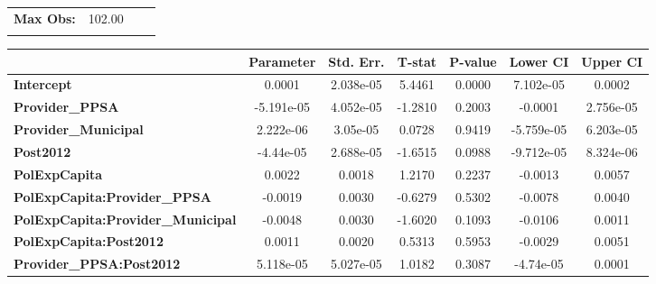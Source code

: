 \begin{center}
\begin{tabular}{lclc}
\textbf{Max Obs:}                                  &       102.00       & \textbf{                     }   &                  \\
\textbf{}                                          &                    & \textbf{                     }   &                  \\
\bottomrule
\end{tabular}
\begin{tabular}{lcccccc}
                                                   & \textbf{Parameter} & \textbf{Std. Err.} & \textbf{T-stat} & \textbf{P-value} & \textbf{Lower CI} & \textbf{Upper CI}  \\
\midrule
\textbf{Intercept}                                 &       0.0001       &     2.038e-05      &      5.4461     &      0.0000      &     7.102e-05     &       0.0002       \\
\textbf{Provider\_PPSA}                            &     -5.191e-05     &     4.052e-05      &     -1.2810     &      0.2003      &      -0.0001      &     2.756e-05      \\
\textbf{Provider\_Municipal}                       &     2.222e-06      &      3.05e-05      &      0.0728     &      0.9419      &     -5.759e-05    &     6.203e-05      \\
\textbf{Post2012}                                  &     -4.44e-05      &     2.688e-05      &     -1.6515     &      0.0988      &     -9.712e-05    &     8.324e-06      \\
\textbf{PolExpCapita}                              &       0.0022       &       0.0018       &      1.2170     &      0.2237      &      -0.0013      &       0.0057       \\
\textbf{PolExpCapita:Provider\_PPSA}               &      -0.0019       &       0.0030       &     -0.6279     &      0.5302      &      -0.0078      &       0.0040       \\
\textbf{PolExpCapita:Provider\_Municipal}          &      -0.0048       &       0.0030       &     -1.6020     &      0.1093      &      -0.0106      &       0.0011       \\
\textbf{PolExpCapita:Post2012}                     &       0.0011       &       0.0020       &      0.5313     &      0.5953      &      -0.0029      &       0.0051       \\
\textbf{Provider\_PPSA:Post2012}                   &     5.118e-05      &     5.027e-05      &      1.0182     &      0.3087      &     -4.74e-05     &       0.0001       \\

\end{tabular}
\end{center}

